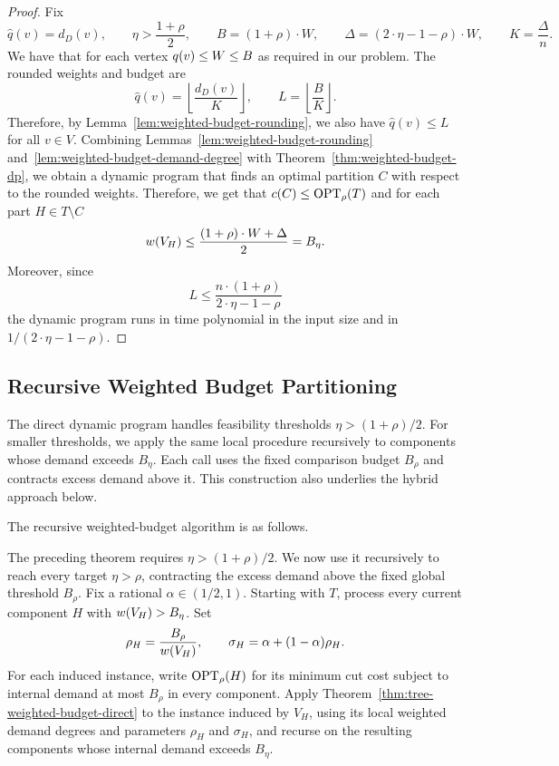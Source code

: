\begin{proof}
Fix
\[
    \widehat q(v) = d_D(v),
    \qquad
    \eta>\frac{1+\rho}{2},
    \qquad
    B=(1+\rho)\cdot W,
    \qquad
    \Delta=(2\cdot\eta-1-\rho)\cdot W,
    \qquad
    K=\frac{\Delta}{n}.
\]
We have that for each vertex $q\mathopen{}\left( v \right)\leq W \leq B$ as required in our problem.
The rounded weights and budget are
\begin{equation}\label{eq:rounded-weight-definition}
    \widehat q(v)=\left\lfloor\frac{d_D(v)}{K}\right\rfloor,
    \qquad
    L=\left\lfloor\frac{B}{K}\right\rfloor.
\end{equation}
Therefore, by Lemma~\ref{lem:weighted-budget-rounding}, we also have $\widehat q(v)\leq L$ for all $v\in V$.
Combining Lemmas~\ref{lem:weighted-budget-rounding} and~\ref{lem:weighted-budget-demand-degree} with Theorem~\ref{thm:weighted-budget-dp}, we obtain a dynamic program that finds an optimal partition $C$ with respect to the rounded weights. Therefore, we get that $c\mathopen{}\left( C \right)\leq\textup{OPT}_{\rho}\mathopen{}\left( T \right)$ and for each part $H\in T\setminus C$
\[
    w\mathopen{}\left( V_H \right)\leq\frac{(1+\rho)\cdot W+\Delta}{2}=B_\eta.
\]
Moreover, since
\[
    L\leq\frac{n\cdot(1+\rho)}{2\cdot\eta-1-\rho}
\]
the dynamic program runs in time polynomial in the input size and in $1/(2\cdot\eta-1-\rho)$.

\end{proof}

\fi

\iffalse
\subsection{Recursive Weighted Budget Partitioning}

The direct dynamic program handles feasibility thresholds $\eta>(1+\rho)/2$. For smaller thresholds, we apply the same local procedure recursively to components whose demand exceeds $B_\eta$. Each call uses the fixed comparison budget $B_\rho$ and contracts excess demand above it. This construction also underlies the hybrid approach below.

The recursive weighted-budget algorithm is as follows.



The preceding theorem requires $\eta>(1+\rho)/2$. We now use it recursively to reach every target $\eta>\rho$, contracting the excess demand above the fixed global threshold $B_\rho$.
Fix a rational $\alpha\in(1/2,1)$. Starting with $T$, process every current component $H$ with $w\mathopen{}\left( V_H \right)>B_\eta$. Set
\[
    \rho_H=\frac{B_\rho}{w\mathopen{}\left( V_H \right)},
    \qquad
    \sigma_H=\alpha+(1-\alpha)\rho_H.
\]
For each induced instance, write $\textup{OPT}_{\rho}(H)$ for its minimum cut cost subject to internal demand at most $B_\rho$ in every component. Apply Theorem~\ref{thm:tree-weighted-budget-direct} to the instance induced by $V_H$, using its local weighted demand degrees and parameters $\rho_H$ and $\sigma_H$, and recurse on the resulting components whose internal demand exceeds $B_\eta$.

